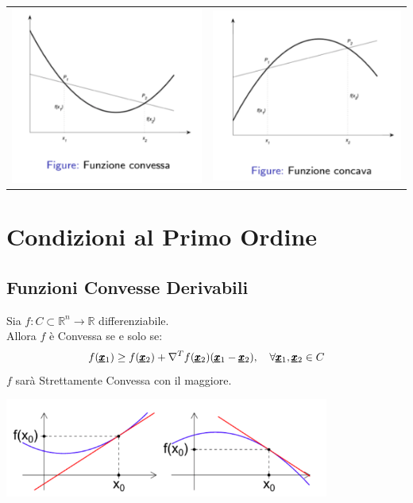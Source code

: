 \begin{table}[h!]
    \centering
    \begin{tabular}{c c}
      \includegraphics[]{Images/FunzioneConvessa.png}  & \includegraphics[]{Images/FunzioneConcava.png}
    \end{tabular}
\end{table}
\section{Condizioni al Primo Ordine}
\subsection{Funzioni Convesse Derivabili}
Sia $f : C \subset \mathbb{R}^n \longrightarrow \mathbb{R}$ differenziabile. \\ 
Allora $f$ è Convessa se e solo se:
\begin{equation*}
    f(\pmb{\underline{x}}_1) \geq f(\pmb{\underline{x}}_2) + \nabla^T f(\pmb{\underline{x}}_2)(\pmb{\underline{x}}_1 - \pmb{\underline{x}}_2), \quad \forall \pmb{\underline{x}}_1, \pmb{\underline{x}}_2 \in C
\end{equation*}
$f$ sarà Strettamente Convessa con il maggiore.
\begin{center}
    \includegraphics[width=0.8\textwidth]{Images/FunzioniDerivabiliConvesseConcave.png}
\end{center}
